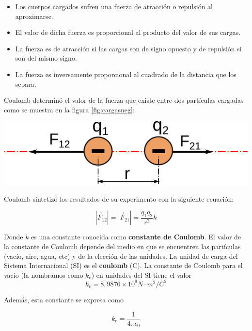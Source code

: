\documentclass{article}
\begin{document}
\begin{itemize}
\item Los cuerpos cargados sufren una fuerza de atracción o repulsión al aproximarse.
\item El valor de dicha fuerza es proporcional al producto del valor de sus cargas.
\item La fuerza es de atracción si las cargas son de signo opuesto y de repulsión si son del mismo signo.
\item La fuerza es inversamente proporcional al cuadrado de la distancia que los separa.
\end{itemize}

Coulomb determinó el valor de la fuerza que existe entre dos partículas cargadas como se muestra en la figura \ref{fig:cargasneg}:

\begin{center}
	\includegraphics[scale=0.25]{figuras/cargasneg.pdf}
\label{fig:cargasneg}
\end{center}

Coulomb sintetizó los resultados de su experimento con la siguiente ecuación:

\begin{equation}
|\vec{F}_{12}| = |\vec{F}_{21}| = \frac{q_1q_2}{r^2}k
\label{eq:CoulombForce}
\end{equation}


Donde $k$ es una constante conocida como \textbf{constante de Coulomb}. El valor de la constante de Coulomb depende del medio en que se encuentren las partículas (vacío, aire, agua, etc) y de la elección de las unidades. La unidad de carga del Sistema Internacional (SI) es el \textbf{coulomb} (C). La constante de Coulomb para el vacío (la nombramos como $k_e$) en unidades del SI tiene el valor
$$k_e = 8,9876 \times 10^9 N \cdot m^2/C^2$$

Además, esta constante se expresa como

$$k_e = \frac{1}{4\pi\epsilon_0} $$ 
\end{document}
